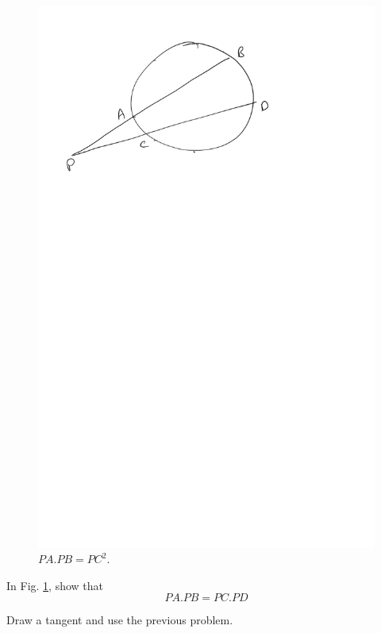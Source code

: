 \begin{figure}[!h]
	\begin{center}
		
		\includegraphics[width=\columnwidth]{./figs/ch4_chord_tangent_prod}
		\vspace*{-10cm}
	\end{center}
	\caption{$PA.PB = PC^2$.}
	\label{ch4_chord_tangent_prod}	
\end{figure}
%
\begin{problem}
	In Fig. \ref{ch4_chord_tangent_prod}, show that\begin{equation}
	PA.PB = PC.PD
	\end{equation}
\end{problem}
\proof Draw a tangent and use the previous problem.
